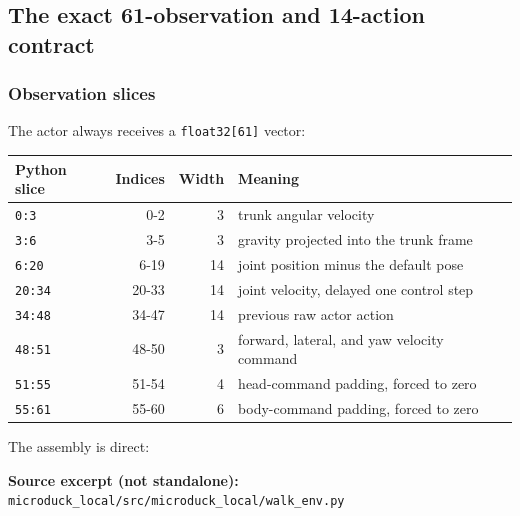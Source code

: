 \documentclass[
  american,
  11pt,
  letterpaper,
]{article}
\newcounter{none} %
\begin{document}
\subsection{The exact 61-observation and 14-action
contract}\label{the-exact-61-observation-and-14-action-contract}

\subsubsection{Observation slices}\label{observation-slices}

The actor always receives a \texttt{float32{[}61{]}} vector:

{\def\LTcaptype{none} %
\begin{longtable}[]{@{}lrrl@{}}
\toprule\noalign{}
Python slice & Indices & Width & Meaning \\
\midrule\noalign{}
\endhead
\bottomrule\noalign{}
\endlastfoot
\texttt{0:3} & 0-2 & 3 & trunk angular velocity \\
\texttt{3:6} & 3-5 & 3 & gravity projected into the trunk frame \\
\texttt{6:20} & 6-19 & 14 & joint position minus the default pose \\
\texttt{20:34} & 20-33 & 14 & joint velocity, delayed one control
step \\
\texttt{34:48} & 34-47 & 14 & previous raw actor action \\
\texttt{48:51} & 48-50 & 3 & forward, lateral, and yaw velocity
command \\
\texttt{51:55} & 51-54 & 4 & head-command padding, forced to zero \\
\texttt{55:61} & 55-60 & 6 & body-command padding, forced to zero \\
\end{longtable}
}

The assembly is direct:

\textbf{Source excerpt (not standalone):}
\texttt{microduc\allowbreak{}k\_\allowbreak{}local/\allowbreak{}src/\allowbreak{}microduc\allowbreak{}k\_\allowbreak{}local/\allowbreak{}walk\_\allowbreak{}env.py}
\end{document}
